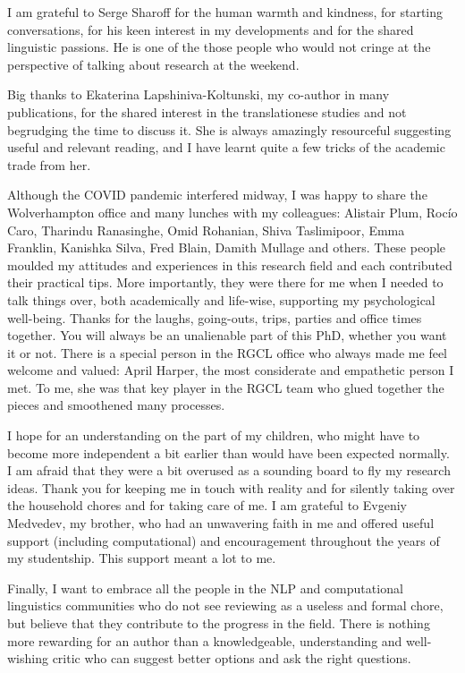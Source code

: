 I am grateful to Serge Sharoff for the human warmth and kindness, for starting conversations, for his keen interest in my developments and for the shared linguistic passions. He is one of the those people who would not cringe at the perspective of talking about research at the weekend.

Big thanks to Ekaterina Lapshiniva-Koltunski, my co-author in many publications, for the shared interest in the translationese studies and not begrudging the time to discuss it. She is always amazingly resourceful suggesting useful and relevant reading, and I have learnt quite a few tricks of the academic trade from her. 

Although the COVID pandemic interfered midway, I was happy to share the Wolverhampton office and many lunches with my colleagues: Alistair Plum, Rocío Caro, Tharindu Ranasinghe, Omid Rohanian, Shiva Taslimipoor, Emma Franklin, Kanishka Silva, Fred Blain, Damith Mullage and others. These people moulded my attitudes and experiences in this research field and each contributed their practical tips. More importantly, they were there for me when I needed to talk things over, both academically and life-wise, supporting my psychological well-being. Thanks for the laughs, going-outs, trips, parties and office times together. You will always be an unalienable part of this PhD, whether you want it or not. 
There is a special person in the RGCL office who always made me feel welcome and valued: April Harper, the most considerate and empathetic person I met. To me, she was that key player in the RGCL team who glued together the pieces and smoothened many processes.

I hope for an understanding on the part of my children, who might have to become more independent a bit earlier than would have been expected normally. I am afraid that they were a bit overused as a sounding board to fly my research ideas. Thank you for keeping me in touch with reality and for silently taking over the household chores and for taking care of me. I am grateful to Evgeniy Medvedev, my brother, who had an unwavering faith in me and offered useful support (including computational) and encouragement throughout the years of my studentship. This support meant a lot to me. 

Finally, I want to embrace all the people in the NLP and computational linguistics communities who do not see reviewing as a useless and formal chore, but believe that they contribute to the progress in the field. There is nothing more rewarding for an author than a knowledgeable, understanding and well-wishing critic who can suggest better options and ask the right questions. 
